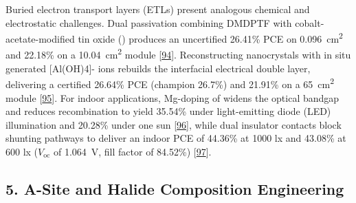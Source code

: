 \documentclass[
  11pt,
]{article}
\begin{document}
Buried electron transport layers (ETLs) present analogous chemical and
electrostatic challenges. Dual passivation combining DMDPTF with
cobalt-acetate-modified tin oxide () produces an uncertified
26.41\% PCE on \qty{0.096}{\centi\meter\squared} and 22.18\% on a
\qty{10.04}{\centi\meter\squared} module
{[}\href{https://doi.org/10.1002/smll.73891}{94}{]}. Reconstructing
 nanocrystals with in situ generated {[}Al(OH)4{]}- ions
rebuilds the interfacial electrical double layer, delivering a certified
26.64\% PCE (champion 26.7\%) and 21.91\% on a
\qty{65}{\centi\meter\squared} module
{[}\href{https://doi.org/10.1002/adma.73286}{95}{]}. For indoor
applications, Mg-doping of  widens the optical bandgap and
reduces recombination to yield 35.54\% under light-emitting diode (LED)
illumination and 20.28\% under one sun
{[}\href{https://doi.org/10.1002/smll.202512808}{96}{]}, while dual
insulator contacts block shunting pathways to deliver an indoor PCE of
44.36\% at 1000 lx and 43.08\% at 600 lx (\(V_\mathrm{oc}\) of
\qty{1.064}{\volt}, fill factor of 84.52\%)
{[}\href{https://doi.org/10.1007/s40820-026-02225-5}{97}{]}.

\subsection{5. A-Site and Halide Composition
Engineering}\label{a-site-and-halide-composition-engineering}
\end{document}

